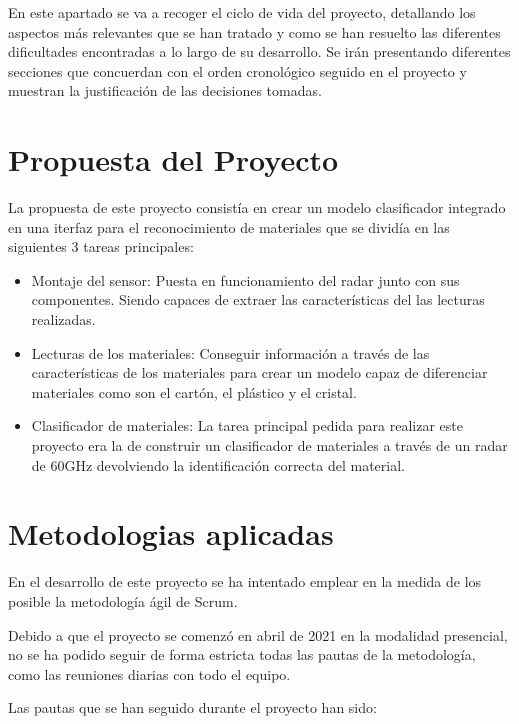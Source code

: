 
En este apartado se va a recoger el ciclo de vida del proyecto, detallando los aspectos más relevantes que se han tratado y como se han resuelto las diferentes dificultades encontradas a lo largo de su desarrollo.
Se irán presentando diferentes secciones que concuerdan con el orden cronológico seguido en el proyecto y muestran la justificación de las decisiones tomadas.

\section{Propuesta del Proyecto}

La propuesta de este proyecto consistía en crear un modelo clasificador integrado en una iterfaz para el reconocimiento de materiales que se dividía en las siguientes 3 tareas principales:

\begin{itemize}
\item Montaje del sensor: Puesta en funcionamiento del radar junto con sus componentes. Siendo capaces de extraer las características del las lecturas realizadas.

\item Lecturas de los materiales: Conseguir información a través de las características de los materiales para crear un modelo capaz de diferenciar materiales como son el cartón, el plástico y el cristal.

\item Clasificador de materiales: La tarea principal pedida para realizar este proyecto era la de construir un clasificador de materiales a través de un radar de 60GHz devolviendo la identificación correcta del material.
\end{itemize}

\section{Metodologias aplicadas}

En el desarrollo de este proyecto se ha intentado emplear en la medida de los posible la metodología ágil de Scrum.

Debido a que el proyecto se comenzó en abril de 2021 en la modalidad presencial, no se ha podido seguir de forma estricta todas las pautas de la metodología, como las reuniones diarias con todo el equipo. 

Las pautas que se han seguido durante el proyecto han sido:

